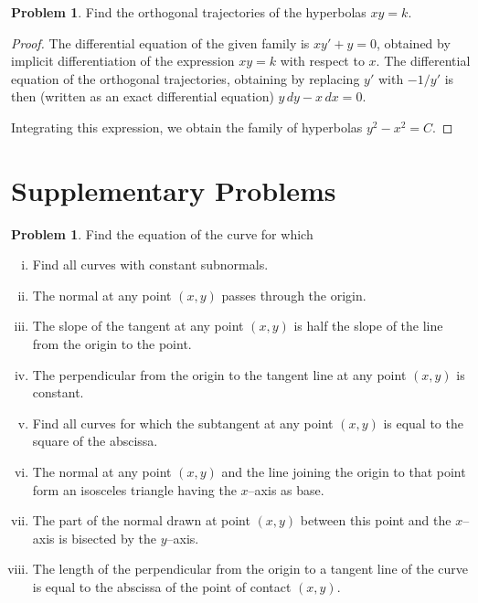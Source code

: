 \documentclass{scrartcl}
\theoremstyle{definition}
\newtheorem{problem}{Problem}
\newtheorem*{problem*}{Problem}
\begin{document}
\begin{problem*}
Find the orthogonal trajectories of the hyperbolas $xy=k$.
\end{problem*}
\begin{proof}
The differential equation of the given family is $xy'+y=0$, obtained by implicit differentiation of the expression $xy=k$ with respect to $x$.  The differential equation of the orthogonal trajectories, obtaining by replacing $y'$ with $-1/y'$ is then (written as an exact differential equation) $y\, dy - x\, dx = 0$.

Integrating this expression, we obtain the family of hyperbolas $y^2-x^2=C$.
\end{proof}

\section*{Supplementary Problems}
\begin{problem}
Find the equation of the curve for which
\begin{enumerate}[(i)]
	\item Find all curves with constant subnormals.
	\item The normal at any point $(x,y)$ passes through the origin.
	\item The slope of the tangent at any point $(x,y)$ is half the slope of the line from the origin to the point.
	\item The perpendicular from the origin to the tangent line at any point $(x,y)$ is constant.
	\item Find all curves for which the subtangent at any point $(x,y)$ is equal to the square of the abscissa.
	\item The normal at any point $(x,y)$ and the line joining the origin to that point form an isosceles triangle having the $x$--axis as base.
	\item The part of the normal drawn at point $(x,y)$ between this point and the $x$--axis is bisected by the $y$--axis.
	\item The length of the perpendicular from the origin to a tangent line of the curve is equal to the abscissa of the point of contact $(x,y)$.
\end{enumerate}
\end{problem}
\end{document}
